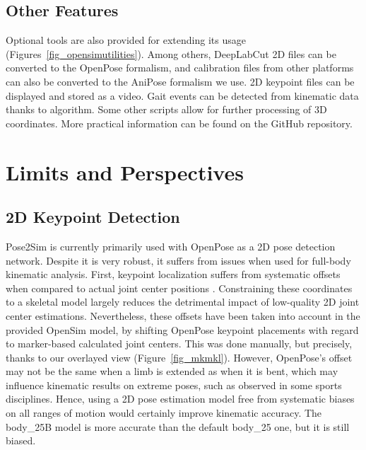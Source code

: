 \subsection{Other Features}

Optional tools are also provided for extending its usage (Figures~\ref{fig_opensimutilities}). Among others, DeepLabCut 2D files can be converted to the OpenPose formalism, and calibration files from other platforms can also be converted to the AniPose \cite{Karashchuk2021} formalism we use. 2D keypoint files can be displayed and stored as a video. Gait events can be detected from kinematic data thanks to \cite{Zeni2008} algorithm. Some other scripts allow for further processing of 3D coordinates. More practical information can be found on the GitHub repository. 


\section{Limits and Perspectives} \label{ch3_lim}

\subsection{2D Keypoint Detection}

Pose2Sim is currently primarily used with OpenPose as a 2D pose detection network. Despite it is very robust, it suffers from issues when used for full-body kinematic analysis. First, keypoint localization suffers from systematic offsets when compared to actual joint center positions \cite{Needham2021b}. Constraining these coordinates to a skeletal model largely reduces the detrimental impact of low-quality 2D joint center estimations. Nevertheless, these offsets have been taken into account in the provided OpenSim model, by shifting OpenPose keypoint placements with regard to marker-based calculated joint centers. This was done manually, but precisely, thanks to our overlayed view (Figure~\ref{fig_mkmkl}). However, OpenPose’s offset may not be the same when a limb is extended as when it is bent, which may influence kinematic results on extreme poses, such as observed in some sports disciplines. Hence, using a 2D pose estimation model free from systematic biases on all ranges of motion would certainly improve kinematic accuracy. The body\_25B model is more accurate than the default body\_25 one, but it is still biased. 

